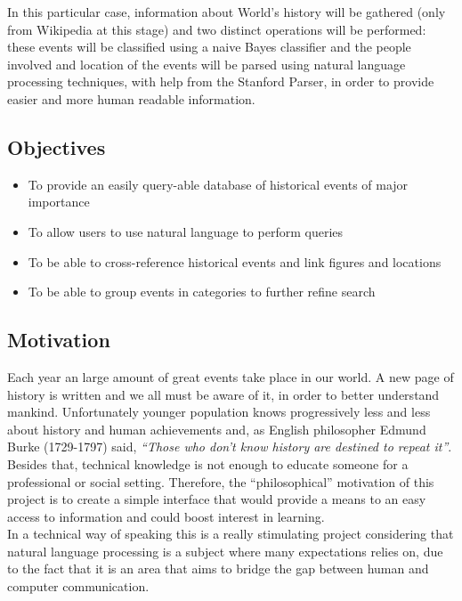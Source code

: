 \documentclass{llncs}
\begin{document}
In this particular case, information about World's history will be gathered (only from Wikipedia at this stage) and two distinct operations will be performed: these events will be classified using a naive Bayes classifier and the people involved and location of the events will be parsed using natural language processing techniques, with help from the Stanford Parser\cite{sp}, in order to provide easier and more human readable information.\\

\subsection{Objectives}

\begin{itemize}
	\item To provide an easily query-able database of historical events of major importance
	\item To allow users to use natural language to perform queries
	\item To be able to cross-reference historical events and link figures and locations
	\item To be able to group events in categories to further refine search
\end{itemize}

\subsection{Motivation}

Each year an large amount of great events take place in our world. A new page of history is written and we all must be aware of it, in order to better understand mankind. Unfortunately younger population knows progressively less and less about history and human achievements and, as English philosopher Edmund Burke (1729-1797) said, \textit{``Those who don't know history are destined to repeat it''}. Besides that, technical knowledge is not enough to educate someone for a professional or social setting.
Therefore, the ``philosophical'' motivation of this project is to create a simple interface that would provide a means to an easy access to information and could boost interest in learning.\\

In a technical way of speaking this is a really stimulating project considering that natural language processing is a subject where many expectations relies on, due to the fact that it is an area that aims to bridge the gap between human and computer communication.
\end{document}
